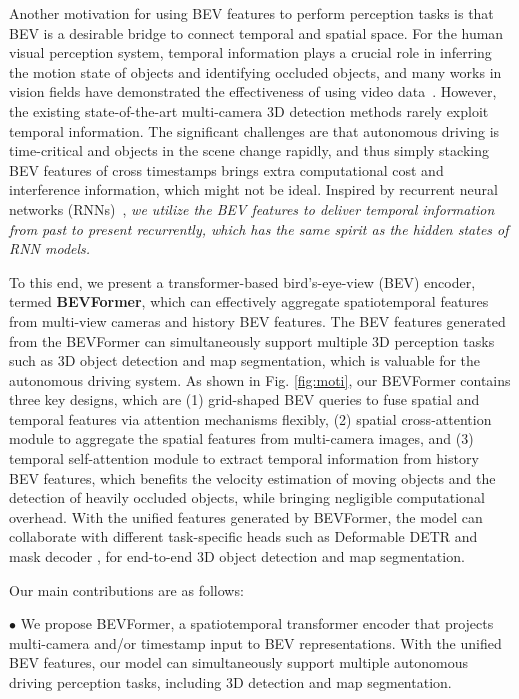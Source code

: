 \documentclass{article}
\begin{document}
Another motivation for using BEV features to perform perception tasks is that BEV is a desirable bridge to connect temporal and spatial space. 
For the human visual perception system, temporal information plays a crucial role in inferring the motion state of objects and identifying occluded objects, and many works in vision fields have demonstrated the effectiveness of using video data~\cite{brazil2020kinematic,ma20223d,luo2018fast,qi2021offboard,kang2016object}.
However, the existing state-of-the-art multi-camera 3D detection methods rarely exploit temporal information.
The significant challenges are that autonomous driving is time-critical and objects in the scene change rapidly, and thus simply stacking BEV features of cross timestamps brings extra computational cost and interference information, which might not be ideal.
Inspired by recurrent neural networks (RNNs)~\cite{hochreiter1997long,cho2014properties}, \emph{we utilize the BEV features to deliver temporal information from past to present recurrently, which has the same spirit as the hidden states of RNN models.}



To this end, we present a transformer-based bird's-eye-view (BEV) encoder, termed \textbf{BEVFormer}, which can effectively aggregate spatiotemporal features from multi-view cameras and history BEV features.
The BEV features generated from the BEVFormer can simultaneously support multiple 3D perception tasks such as 3D object detection and map segmentation, which is valuable for the autonomous driving system.
As shown in Fig. \ref{fig:moti}, our BEVFormer contains three key designs, which are
(1) grid-shaped BEV queries to  fuse spatial and temporal features via attention mechanisms flexibly,
(2) spatial cross-attention module to aggregate the spatial features from multi-camera images,
and (3) temporal self-attention module to extract temporal information from history BEV features, which benefits the velocity estimation of moving objects and the detection of heavily occluded objects, while bringing negligible computational overhead. 
With the unified features generated by BEVFormer,
the model can collaborate with different task-specific heads such as Deformable DETR \cite{zhu2020deformable} and mask decoder \cite{li2021panoptic}, for end-to-end 3D object detection and map segmentation. 



Our main contributions are as follows:

$\bullet$ We propose BEVFormer, a spatiotemporal transformer encoder that  projects multi-camera and/or timestamp input to BEV representations. With the unified BEV features, our model can simultaneously support multiple autonomous driving perception tasks, including 3D detection and map segmentation.
 
\end{document}
